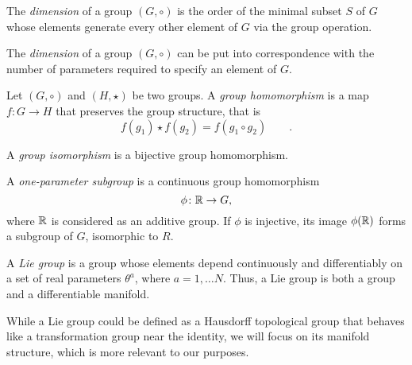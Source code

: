 \begin{definition}
    The \emph{dimension} of a group $(G,\circ)$ is the order of the minimal subset $S$ of $G$ whose elements generate every other element of $G$ via the group operation.
    
\end{definition}

\begin{remark}
     The \emph{dimension} of a group $(G,\circ)$ can be put into correspondence with the number of parameters required to specify an element of $G$.
\end{remark}

\begin{definition}\label{def:group-homomorphism}
    Let $(G, \circ)$ and $(H, \star)$ be two groups. A \emph{group homomorphism} is a map $f\colon G \to H$  that preserves the group structure, that is
    \begin{equation}
        f(g_1) \star f(g_2) = f(g_1 \circ g_2) \qquad .
    \end{equation}

    A \emph{group isomorphism} is a bijective group homomorphism.
\end{definition}

\begin{definition}\label{def:one-parameter}
    A \emph{one-parameter subgroup} is a continuous group homomorphism
    \begin{equation}
        \phi\colon \mathbb{R} \to G ,
    \end{equation}
    where $\mathbb{R}$ is considered as an additive group. If $\phi$ is injective, its image $\phi(\mathbb{R})$ forms a subgroup of $G$, isomorphic to $R$.
\end{definition}

\begin{definition}
    A \emph{Lie group} is a group whose elements depend continuously and differentiably on a set of real parameters $\theta^a$, where  $a = 1, \dots N$. Thus, a Lie group is both a group and a differentiable manifold.
\end{definition}

\begin{remark}
    While a Lie group could be defined as a Hausdorff topological group that behaves
    like a transformation group near the identity, we will focus on its manifold structure, which
    is more relevant to our purposes.
\end{remark}

